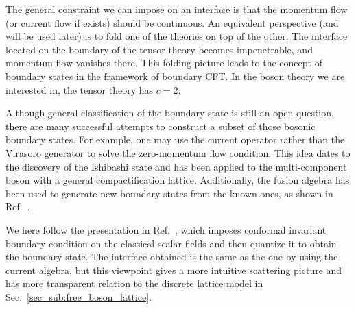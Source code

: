 
The general constraint we can impose on an interface is that the momentum flow (or current flow if exists) should be continuous. An equivalent perspective (and will be used later) is to fold one of the theories on top of the other. The interface located on the boundary of the tensor theory becomes impenetrable, and momentum flow vanishes there. This folding picture leads to the concept of boundary states in the framework of boundary CFT\cite{cardy_boundary_2004,cardy_conformal_1984}. In the boson theory we are interested in, the tensor theory has $c = 2$.

Although general classification of the boundary state is still an open question\cite{affleck_quantum_2001}, there are many successful attempts to construct a subset of those bosonic boundary states. For example, one may use the current operator rather than the Virasoro generator to solve the zero-momentum flow condition. This idea dates to the discovery of the Ishibashi state\cite{ishibashi_boundary_1989} and has been applied to the multi-component boson with a general compactification lattice\cite{affleck_quantum_2001,oshikawa_boundary_2010,quella_reflection_2007}. Additionally, the fusion algebra has been used to generate new boundary states from the known ones, as shown in Ref.~. 

We here follow the presentation in Ref.~, which imposes conformal invariant boundary condition on the classical scalar fields and then quantize it to obtain the boundary state. The interface obtained is the same as the one by using the current algebra\cite{affleck_quantum_2001,oshikawa_boundary_2010,quella_reflection_2007}, but this viewpoint gives a more intuitive scattering picture and has more transparent relation to the discrete lattice model in Sec.~\ref{sec_sub:free_boson_lattice}. 

